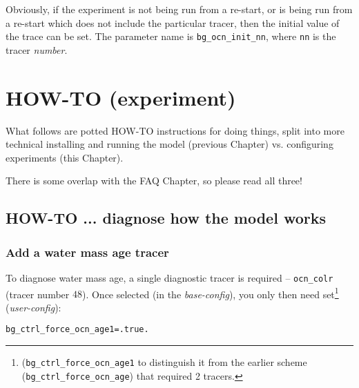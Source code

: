 \documentclass[11pt,fleqn]{book} %
\begin{document}
Obviously, if the experiment is not being run from a re-start, or is being run from a re-start which does not include the particular tracer, then the initial value of the trace can be set. The parameter name is \texttt{bg\_ocn\_init\_nn}, where \texttt{nn} is the tracer \textit{number}.


\cleardoublepage


\chapter{HOW-TO (experiment)}\label{how-to-experiment}

\hfill \break
\vspace{24mm}

\Large
What follows are potted HOW-TO instructions for doing things, split into more technical installing and running the model (previous Chapter) vs. configuring experiments (this Chapter).
\vspace{2mm}

There is some overlap with the FAQ Chapter, so please read all three!
\normalsize


\newpage


\section{HOW-TO ... diagnose how the model works}
\vspace{2mm}

%
\subsection*{Add a water mass age tracer}
\vspace{1mm}

To diagnose water mass age, a single diagnostic tracer is required -- \texttt{ocn\_colr} (tracer number \(48\)). Once selected (in the \textit{base-config}), you only then need set\footnote{(\texttt{bg\_ctrl\_force\_ocn\_age1} to distinguish it from the earlier scheme (\texttt{bg\_ctrl\_force\_ocn\_age}) that required 2 tracers.} (\textit{user-config}):
\vspace{-2pt}\begin{verbatim}
bg_ctrl_force_ocn_age1=.true.
\end{verbatim}\vspace{-2pt}
\end{document}
